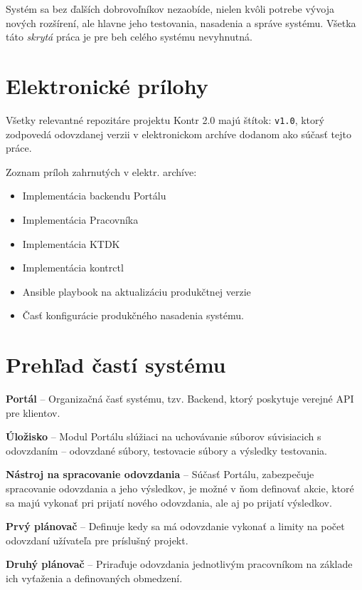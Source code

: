 \documentclass[
  digital, %
  oneside, %
  table,   %
  lof,     %
  lot,   %
]{fithesis3}
\begin{document}
Systém sa bez ďalších dobrovoľníkov nezaobíde, nielen kvôli potrebe vývoja nových rozšírení, ale hlavne jeho testovania, nasadenia a správe systému. Všetka táto \emph{skrytá} práca je pre beh celého systému nevyhnutná.


\appendix
\chapter{Elektronické prílohy}
Všetky relevantné repozitáre projektu Kontr 2.0 majú štítok: \texttt{v1.0}, ktorý zodpovedá odovzdanej verzii v elektronickom archíve dodanom ako súčasť tejto práce.

Zoznam príloh zahrnutých v elektr. archíve:

\begin{itemize} 
	\item Implementácia backendu Portálu
	\item Implementácia Pracovníka
	\item Implementácia KTDK
	\item Implementácia kontrctl
	\item Ansible playbook na aktualizáciu produkčtnej verzie
    \item Časť konfigurácie produkčného nasadenia systému. 
\end{itemize}

\chapter{Prehľad častí systému}

\hspace{\parindent}\textbf{Portál} -- Organizačná časť systému, tzv. Backend, ktorý poskytuje verejné API pre klientov.

\textbf{Úložisko} -- Modul Portálu slúžiaci na uchovávanie súborov súvisiacich s odovzdaním -- odovzdané súbory, testovacie súbory a výsledky testovania.

\textbf{Nástroj na spracovanie odovzdania} -- Súčasť Portálu, zabezpečuje spracovanie odovzdania a jeho výsledkov, je možné v ňom definovať akcie, ktoré sa majú vykonať pri prijatí nového odovzdania, ale aj po prijatí výsledkov.

\textbf{Prvý plánovač} -- Definuje kedy sa má odovzdanie vykonať a limity na počet odovzdaní užívateľa pre príslušný projekt.

\textbf{Druhý plánovač} -- Priraďuje odovzdania jednotlivým pracovníkom na základe ich vyťaženia a definovaných obmedzení.
\end{document}
